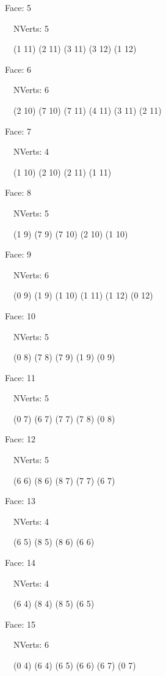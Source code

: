 \documentclass{article}
\begin{document}
{\footnotesize 

Face: 5

\   \    NVerts: 5

 \   \   (1 11) (2 11) (3 11) (3 12) (1 12)}

{\footnotesize 

Face: 6

\   \    NVerts: 6

 \   \   (2 10) (7 10) (7 11) (4 11) (3 11) (2 11)}

{\footnotesize 

Face: 7

\   \    NVerts: 4

 \   \   (1 10) (2 10) (2 11) (1 11)}

{\footnotesize 

Face: 8

\   \    NVerts: 5

 \   \   (1 9) (7 9) (7 10) (2 10) (1 10)}

{\footnotesize 

Face: 9

\   \    NVerts: 6

 \   \   (0 9) (1 9) (1 10) (1 11) (1 12) (0 12)}

{\footnotesize 

Face: 10

\   \    NVerts: 5

 \   \   (0 8) (7 8) (7 9) (1 9) (0 9)}

{\footnotesize 

Face: 11

\   \    NVerts: 5

 \   \   (0 7) (6 7) (7 7) (7 8) (0 8)}

{\footnotesize 

Face: 12

\   \    NVerts: 5

 \   \   (6 6) (8 6) (8 7) (7 7) (6 7)}

{\footnotesize 

Face: 13

\   \    NVerts: 4

 \   \   (6 5) (8 5) (8 6) (6 6)}

{\footnotesize 

Face: 14

\   \    NVerts: 4

 \   \   (6 4) (8 4) (8 5) (6 5)}

{\footnotesize 

Face: 15

\   \    NVerts: 6

 \   \   (0 4) (6 4) (6 5) (6 6) (6 7) (0 7)}
\end{document}
